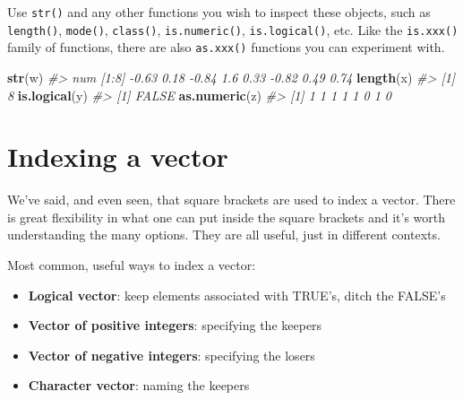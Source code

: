 \documentclass[
]{book}
\newenvironment{Shaded}{\begin{snugshade}}{\end{snugshade}}
\newcommand{\CommentTok}[1]{\textcolor[rgb]{0.56,0.35,0.01}{\textit{#1}}}
\newcommand{\KeywordTok}[1]{\textcolor[rgb]{0.13,0.29,0.53}{\textbf{#1}}}
\newcommand{\NormalTok}[1]{#1}
\providecommand{\tightlist}{%
  \setlength{\itemsep}{0pt}\setlength{\parskip}{0pt}}
\begin{document}
Use \texttt{str()} and any other functions you wish to inspect these objects, such as \texttt{length()}, \texttt{mode()}, \texttt{class()}, \texttt{is.numeric()}, \texttt{is.logical()}, etc. Like the \texttt{is.xxx()} family of functions, there are also \texttt{as.xxx()} functions you can experiment with.

\begin{Shaded}
\begin{Highlighting}[]
\KeywordTok{str}\NormalTok{(w)}
\CommentTok{#>  num [1:8] -0.63 0.18 -0.84 1.6 0.33 -0.82 0.49 0.74}
\KeywordTok{length}\NormalTok{(x)}
\CommentTok{#> [1] 8}
\KeywordTok{is.logical}\NormalTok{(y)}
\CommentTok{#> [1] FALSE}
\KeywordTok{as.numeric}\NormalTok{(z)}
\CommentTok{#> [1] 1 1 1 1 1 0 1 0}
\end{Highlighting}
\end{Shaded}

\hypertarget{indexing-a-vector}{%
\section{Indexing a vector}\label{indexing-a-vector}}

We've said, and even seen, that square brackets are used to index a vector. There is great flexibility in what one can put inside the square brackets and it's worth understanding the many options. They are all useful, just in different contexts.

Most common, useful ways to index a vector:

\begin{itemize}
\tightlist
\item
  \textbf{Logical vector}: keep elements associated with TRUE's, ditch the FALSE's
\item
  \textbf{Vector of positive integers}: specifying the keepers
\item
  \textbf{Vector of negative integers}: specifying the losers
\item
  \textbf{Character vector}: naming the keepers
\end{itemize}
\end{document}
